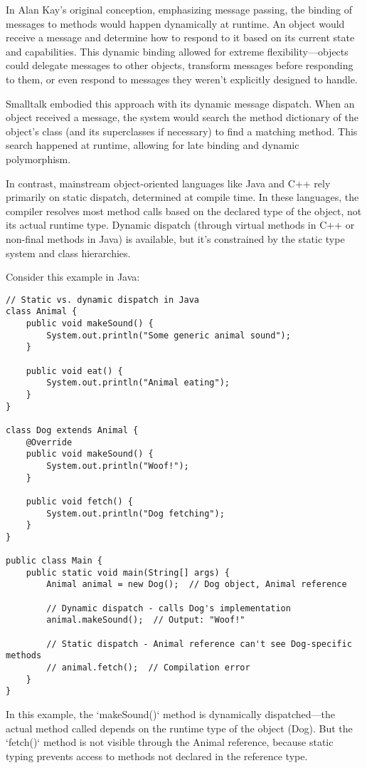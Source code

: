 \documentclass[11pt]{article}
\begin{document}
In Alan Kay's original conception, emphasizing message passing, the binding of messages to methods would happen dynamically at runtime. An object would receive a message and determine how to respond to it based on its current state and capabilities. This dynamic binding allowed for extreme flexibility—objects could delegate messages to other objects, transform messages before responding to them, or even respond to messages they weren't explicitly designed to handle.

Smalltalk embodied this approach with its dynamic message dispatch. When an object received a message, the system would search the method dictionary of the object's class (and its superclasses if necessary) to find a matching method. This search happened at runtime, allowing for late binding and dynamic polymorphism.

In contrast, mainstream object-oriented languages like Java and C++ rely primarily on static dispatch, determined at compile time. In these languages, the compiler resolves most method calls based on the declared type of the object, not its actual runtime type. Dynamic dispatch (through virtual methods in C++ or non-final methods in Java) is available, but it's constrained by the static type system and class hierarchies.

Consider this example in Java:

\begin{verbatim}
// Static vs. dynamic dispatch in Java
class Animal {
    public void makeSound() {
        System.out.println("Some generic animal sound");
    }

    public void eat() {
        System.out.println("Animal eating");
    }
}

class Dog extends Animal {
    @Override
    public void makeSound() {
        System.out.println("Woof!");
    }

    public void fetch() {
        System.out.println("Dog fetching");
    }
}

public class Main {
    public static void main(String[] args) {
        Animal animal = new Dog();  // Dog object, Animal reference

        // Dynamic dispatch - calls Dog's implementation
        animal.makeSound();  // Output: "Woof!"

        // Static dispatch - Animal reference can't see Dog-specific methods
        // animal.fetch();  // Compilation error
    }
}
\end{verbatim}

In this example, the `makeSound()` method is dynamically dispatched—the actual method called depends on the runtime type of the object (Dog). But the `fetch()` method is not visible through the Animal reference, because static typing prevents access to methods not declared in the reference type.
\end{document}
